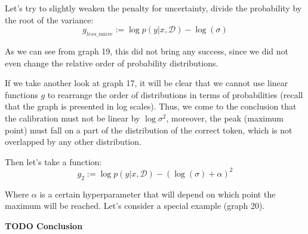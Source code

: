 \documentclass[a4paper,14pt]{extarticle}
\begin{document}
	Let's try to slightly weaken the penalty for uncertainty, divide the probability by the root of the variance:
	\begin{equation}
		g_{less\_naive} := \log p(y | x, \mathcal{D}) - \log(\sigma)
	\end{equation}
	
	As we can see from graph 19, this did not bring any success, since we did not even change the relative order of probability distributions.
	\begin{figure}[t]
	\end{figure}

	If we take another look at graph 17, it will be clear that we cannot use linear functions $g$ to rearrange the order of distributions in terms of probabilities (recall that the graph is presented in log scales). Thus, we come to the conclusion that the calibration must not be linear by $\log \sigma^2$, moreover, the peak (maximum point) must fall on a part of the distribution of the correct token, which is not overlapped by any other distribution.

	Then let's take a function:
	\begin{equation}
		g_{2} := \log p(y | x, \mathcal{D}) - (\log(\sigma) + \alpha)^2
	\end{equation}
	
	 Where $\alpha$ is a certain hyperparameter that will depend on which point the maximum will be reached. Let's consider a special example (graph 20).
	
	\textbf{TODO Conclusion}
	
\end{document}

